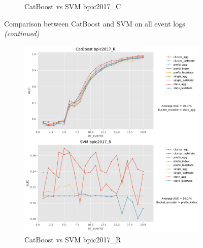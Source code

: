 \documentclass[twoside,11pt]{Latex/Classes/PhDthesisPSnPDF}
\begin{document}
\begin{figure}[t!]
\begin{subfigure}{0.48\textwidth}
		\caption{CatBoost vs SVM bpic2017\_C} \label{fig:b17ccs}
	\end{subfigure}
		\caption{Comparison between CatBoost and SVM on all event logs \textit{(continued)}}
	\label{fig:r2cs}
\end{figure}


\begin{figure}[t!] %

	\begin{subfigure}{0.48\textwidth}
		\includegraphics[width=\linewidth]{images/catboost/graphssvm/bpic2017_R_CatBoost_svm.pdf}
		\caption{CatBoost vs SVM bpic2017\_R} \label{fig:b17rcs}
	\end{subfigure}\hspace*{\fill}
	\begin{subfigure}{0.48\textwidth}

\end{subfigure}
\end{figure}
\end{document}
